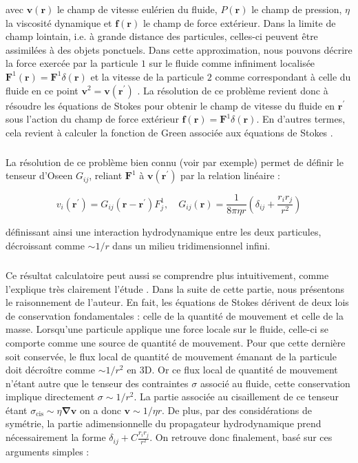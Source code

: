 \noindent avec $\mathbf{v}(\mathbf{r})$ le champ de vitesse eulérien du fluide, $P(\mathbf{r})$ le champ de pression, $\eta$ la viscosité dynamique et $\mathbf{f}(\mathbf{r})$ le champ de force extérieur. Dans la limite de champ lointain, i.e. à grande distance des particules, celles-ci peuvent être assimilées à des objets ponctuels. Dans cette approximation, nous pouvons décrire la force exercée par la particule $1$ sur le fluide comme infiniment localisée $\mathbf{F}^1(\mathbf{r}) = \mathbf{F}^1\delta (\mathbf{r})$ et la vitesse de la particule $2$ comme correspondant à celle du fluide en ce point $\mathbf{v}^2 = \mathbf{v}(\mathbf{r}^\prime)$ \cite{diamant_hydrodynamic_2009}. La résolution de ce problème revient donc à résoudre les équations de Stokes pour obtenir le champ de vitesse du fluide en $\mathbf{r}^\prime$ sous l'action du champ de force extérieur $\mathbf{f}(\mathbf{r}) = \mathbf{F}^1\delta (\mathbf{r})$. En d'autres termes, cela revient à calculer la fonction de Green associée aux équations de Stokes \cite{noauthor_physique_nodate}.

\subparagraph{}La résolution de ce problème bien connu (voir \cite{lisicki_four_2013} par exemple) permet de définir le tenseur d'Oseen $G_{ij}$, reliant $\mathbf{F}^1$ à $\mathbf{v}(\mathbf{r}^\prime)$ par la relation linéaire :

\begin{equation}
	v_i (\mathbf{r}^\prime) = G_{ij}(\mathbf{r} -\mathbf{r}^\prime)F^1_j, \quad G_{ij}(\mathbf{r}) = \frac{1}{8\pi\eta r}\left( \delta_{ij}+\frac{r_ir_j}{r^2} \right)
\end{equation}

\noindent définissant ainsi une interaction hydrodynamique entre les deux particules, décroissant comme $\sim 1/r$ dans un milieu tridimensionnel infini.

\subparagraph{}Ce résultat calculatoire peut aussi se comprendre plus intuitivement, comme l'explique très clairement l'étude \cite{diamant_hydrodynamic_2009}. Dans la suite de cette partie, nous présentons le raisonnement de l'auteur. En fait, les équations de Stokes dérivent de deux lois de conservation fondamentales : celle de la quantité de mouvement et celle de la masse. Lorsqu'une particule applique une force locale sur le fluide, celle-ci se comporte comme une source de quantité de mouvement. Pour que cette dernière soit conservée, le flux local de quantité de mouvement émanant de la particule doit décroître comme $\sim 1/r^2$ en 3D. Or ce flux local de quantité de mouvement n'étant autre que le tenseur des contraintes $\sigma$ associé au fluide, cette conservation implique directement $\sigma \sim 1/r^2$. La partie associée au cisaillement de ce tenseur étant $\sigma_\text{cis}\sim \eta \mathbf{\nabla} \mathbf{v}$ on a donc $\mathbf{v}\sim 1/\eta r$. De plus, par des considérations de symétrie, la partie adimensionnelle du propagateur hydrodynamique prend nécessairement la forme $\delta_{ij}+C\frac{r_ir_j}{r^2}$. On retrouve donc finalement, basé sur ces arguments simples :

